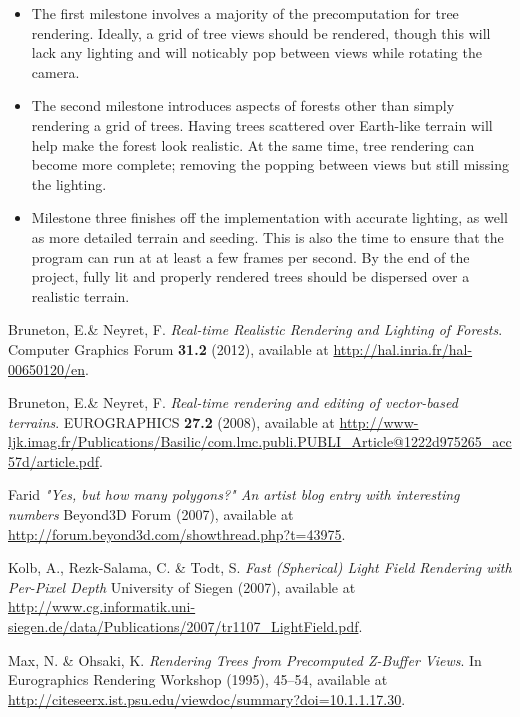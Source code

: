 \documentclass{article}
\begin{document}
\begin {itemize}
\item The first milestone involves a majority of the precomputation for tree rendering. Ideally, a grid of tree views should be rendered, though this will lack any lighting and will noticably pop between views while rotating the camera.

\item The second milestone introduces aspects of forests other than simply rendering a grid of trees. Having trees scattered over Earth-like terrain will help make the forest look realistic. At the same time, tree rendering can become more complete; removing the popping between views but still missing the lighting.

\item Milestone three finishes off the implementation with accurate lighting, as well as more detailed terrain and seeding. This is also the time to ensure that the program can run at at least a few frames per second. By the end of the project, fully lit and properly rendered trees should be dispersed over a realistic terrain.
\end {itemize}

\newpage
\begin{thebibliography}{9}

  Bruneton, E.\& Neyret, F.
  \emph{Real-time Realistic Rendering and Lighting of Forests}.
  Computer Graphics Forum \textbf{31.2} (2012), available at
  \url{http://hal.inria.fr/hal-00650120/en}.

  Bruneton, E.\& Neyret, F.
  \emph{Real-time rendering and editing of vector-based terrains}.
  EUROGRAPHICS \textbf{27.2} (2008), available at
  \url{http://www-ljk.imag.fr/Publications/Basilic/com.lmc.publi.PUBLI_Article@1222d975265_acc57d/article.pdf}.

  Farid
  \emph{"Yes, but how many polygons?" An artist blog entry with interesting numbers}
  Beyond3D Forum (2007), available at
  \url{http://forum.beyond3d.com/showthread.php?t=43975}.

  Kolb, A., Rezk-Salama, C. \& Todt, S.
  \emph{Fast (Spherical) Light Field Rendering with Per-Pixel Depth}
  University of Siegen (2007), available at
  \url{http://www.cg.informatik.uni-siegen.de/data/Publications/2007/tr1107_LightField.pdf}.

  Max, N. \& Ohsaki, K.
  \emph{Rendering Trees from Precomputed Z-Buffer Views}.
  In Eurographics Rendering Workshop (1995), 45--54, available at
  \url{http://citeseerx.ist.psu.edu/viewdoc/summary?doi=10.1.1.17.30}.

\end{thebibliography}
\end{document}
